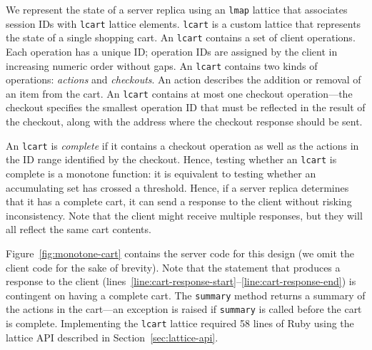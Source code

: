 
We represent the state of a server replica using an \texttt{lmap} lattice that
associates session IDs with \texttt{lcart} lattice elements. \texttt{lcart} is a
custom lattice that represents the state of a single shopping cart. An
\texttt{lcart} contains a set of client operations. Each operation has a unique
ID; operation IDs are assigned by the client in increasing numeric order without
gaps. An \texttt{lcart} contains two kinds of operations: \emph{actions} and
\emph{checkouts}. An action describes the addition or removal of an item from
the cart. An \texttt{lcart} contains at most one checkout operation---the
checkout specifies the smallest operation ID that must be reflected in the
result of the checkout, along with the address where the checkout response
should be sent.

An \texttt{lcart} is \emph{complete} if it contains a checkout operation as well
as the actions in the ID range identified by the checkout. Hence, testing
whether an \texttt{lcart} is complete is a monotone function: it is equivalent
to testing whether an accumulating set has crossed a threshold. Hence, if a
server replica determines that it has a complete cart, it can send a response to
the client without risking inconsistency. Note that the client might receive
multiple responses, but they will all reflect the same cart contents.

Figure~\ref{fig:monotone-cart} contains the server code for this design (we omit
the client code for the sake of brevity). Note that the statement that produces
a response to the client
(lines~\ref{line:cart-response-start}--\ref{line:cart-response-end}) is
contingent on having a complete cart. The \texttt{summary} method returns a
summary of the actions in the cart---an exception is raised if \texttt{summary}
is called before the cart is complete. Implementing the \texttt{lcart} lattice
required 58 lines of Ruby using the lattice API described in
Section~\ref{sec:lattice-api}.

